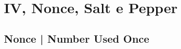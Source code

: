 

\textsf{\small }

\section{IV, Nonce, Salt e Pepper} %


\textsf{\small }

\subsection{Nonce | Number Used Once} %




\textsf{\small }

